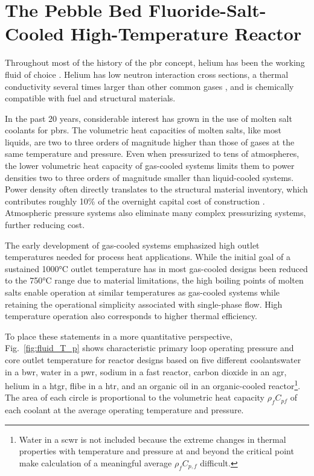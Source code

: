 \chapter[The Pebble Bed Fluoride-Salt-Cooled High-Temperature Reactor]{The Pebble Bed Fluoride-Salt-Cooled High-Temperature Reactor}
\label{sec:pbfhr}

Throughout most of the history of the \gls{pbr} concept, helium has been the working fluid of choice \cite{claxton,hecker,oehme,nrc_avr,moormann,thtr_1990,hofmann,thomas,koster,gao,chen_htr,xu_htr,htrpm}. Helium has low neutron interaction cross sections, a thermal conductivity several times larger than other common gases \cite{gases_k}, and is chemically compatible with fuel and structural materials. 

In the past 20 years, considerable interest has grown in the use of molten salt coolants for \glspl{pbr}. The volumetric heat capacities of molten salts, like most liquids, are two to three orders of magnitude higher than those of gases at the same temperature and pressure. Even when pressurized to tens of atmospheres, the lower volumetric heat capacity of gas-cooled systems limits them to power densities two to three orders of magnitude smaller than liquid-cooled systems. Power density often directly translates to the structural material inventory, which contributes roughly 10\% of the overnight capital cost of construction \cite{xin_wang_thesis}. Atmospheric pressure systems also eliminate many complex pressurizing systems, further reducing cost.

The early development of gas-cooled systems emphasized high outlet temperatures needed for process heat applications. While the initial goal of a sustained 1000\si{\celsius} outlet temperature has in most gas-cooled designs been reduced to the 750\si{\celsius} range due to material limitations, the high boiling points of molten salts enable operation at similar temperatures as gas-cooled systems while retaining the operational simplicity associated with single-phase flow. High temperature operation also corresponds to higher thermal efficiency. 

To place these statements in a more quantitative perspective, Fig.\ \ref{fig:fluid_T_p} shows characteristic primary loop operating pressure and core outlet temperature for reactor designs based on five different coolants\mdash water in a \gls{bwr}, water in a \gls{pwr}, sodium in a fast reactor, carbon dioxide in an \gls{agr}, helium in a \gls{htgr}, \gls{flibe} in a \gls{htr}, and an organic oil in an organic-cooled reactor\hspace{0.02cm}\footnote{Water in a \gls{scwr} is not included because the extreme changes in thermal properties with temperature and pressure at and beyond the critical point make calculation of a meaningful average \(\rho_fC_{p,f}\) difficult.}. The area of each circle is proportional to the volumetric heat capacity \(\rho_fC_{pf}\) of each coolant at the average operating temperature and pressure. 

